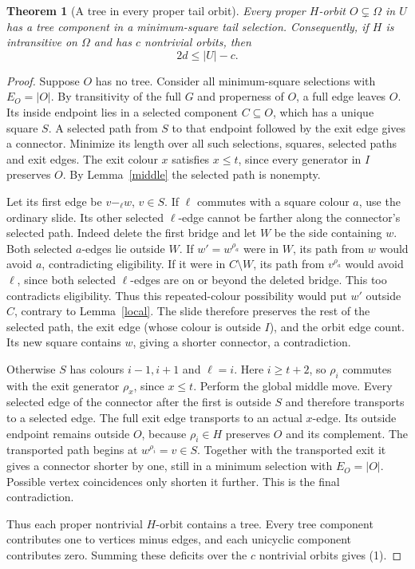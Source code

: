 \documentclass[11pt,a4paper]{article}
\newtheorem{theorem}[lemma]{Theorem}
\begin{document}
\begin{theorem}[A tree in every proper tail orbit]\label{tree}
Every proper $H$-orbit $O\subsetneq\Omega$ in $U$ has a
tree component in a minimum-square tail selection.
Consequently, if $H$ is intransitive on $\Omega$ and has
$c$ nontrivial orbits, then
\[
                         2d\leq |U|-c.                 \tag{1}
\]
\end{theorem}
\begin{proof}
Suppose $O$ has no tree. Consider all minimum-square
selections with $E_O=|O|$. By transitivity of the full $G$
and properness of $O$, a full edge leaves $O$. Its inside
endpoint lies in a selected component $C\subseteq O$, which
has a unique square $S$. A selected path from $S$ to that
endpoint followed by the exit edge gives a connector.
Minimize its length over all such selections, squares,
selected paths and exit edges. The exit colour $x$ satisfies
$x\leq t$, since every generator in $I$ preserves $O$.
By Lemma~\ref{middle} the selected path is nonempty.

Let its first edge be $v\mathrel{-_\ell}w$, $v\in S$.
If $\ell$ commutes with a square colour $a$, use the
ordinary slide. Its other selected $\ell$-edge cannot be
farther along the connector's selected path. Indeed delete
the first bridge and let $W$ be the side containing $w$.
Both selected $a$-edges lie outside $W$. If
$w'=w^{\rho_a}$ were in $W$, its path from $w$ would
avoid $a$, contradicting eligibility. If it were in
$C\setminus W$, its path from $v^{\rho_a}$ would avoid
$\ell$, since both selected $\ell$-edges are on or beyond
the deleted bridge. This too contradicts eligibility.
Thus this repeated-colour possibility would put $w'$ outside
$C$, contrary to Lemma~\ref{local}.
The slide therefore preserves the rest of the selected path,
the exit edge (whose colour is outside $I$), and the orbit
edge count. Its new square contains $w$, giving a shorter
connector, a contradiction.

Otherwise $S$ has colours $i-1,i+1$ and $\ell=i$.
Here $i\geq t+2$, so $\rho_i$ commutes with the exit
generator $\rho_x$, since $x\leq t$.
Perform the global middle move. Every selected edge of the
connector after the first is outside $S$ and therefore
transports to a selected edge. The full exit edge transports
to an actual $x$-edge. Its outside endpoint remains outside
$O$, because $\rho_i\in H$ preserves $O$ and its complement.
The transported path begins at $w^{\rho_i}=v\in S$.
Together with the transported exit it gives a connector
shorter by one, still in a minimum selection with
$E_O=|O|$. Possible vertex coincidences only shorten it
further. This is the final contradiction.

Thus each proper nontrivial $H$-orbit contains a tree.
Every tree component contributes one to vertices minus edges,
and each unicyclic component contributes zero. Summing these
deficits over the $c$ nontrivial orbits gives (1).
\end{proof}
\end{document}
